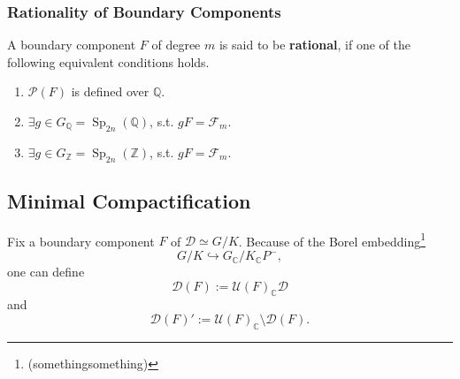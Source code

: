 \documentclass[11pt,english]{smfart}
\theoremstyle{definition}
\theoremstyle{remark}
\renewcommand{\C}{\mathbb{C}}
\newcommand{\Q}{\mathbb{Q}}
\newcommand{\Z}{\mathbb{Z}}
\DeclareMathOperator{\Sp}{Sp}
\newcommand{\under}{\!\setminus\!}
\begin{document}
\subsubsection{Rationality of Boundary Components}
A boundary component $F$ of degree $m$ is said to be \textbf{rational}, if one of the following equivalent conditions holds.
\begin{enumerate}
    \item[(1)] $\mathcal{P}(F)$ is defined over $\Q$.
    \item[(2)] $\exists g\in G_\Q = \Sp_{2n}(\Q)$, s.t. $gF = \mathcal{F}_m$.
    \item[(3)] $\exists g\in G_\Z = \Sp_{2n}(\Z)$, s.t. $gF = \mathcal{F}_m$.
\end{enumerate}



\subsection{Minimal Compactification}
Fix a boundary component $F$ of $\mathcal{D}\simeq G/K$.
Because of the Borel embedding\footnote{(somethingsomething)}\[G/K\hookrightarrow G_{\C}/K_{\C}P^{-},\] one can define\[\mathcal{D}(F) := \mathcal{U}(F)_\C\mathcal{D}\] and \[\mathcal{D}(F)' := \mathcal{U}(F)_\C\under\mathcal{D}(F).\]
\end{document}
